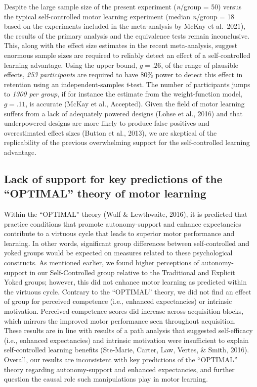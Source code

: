 \documentclass[
  english,
  man, donotrepeattitle,floatsintext]{apa7}
\begin{document}
Despite the large sample size of the present experiment (\emph{n}/group = 50) versus the typical self-controlled motor learning experiment (median \emph{n}/group = 18 based on the experiments included in the meta-analysis by McKay et al.~2021), the results of the primary analysis and the equivalence tests remain inconclusive. This, along with the effect size estimates in the recent meta-analysis, suggest enormous sample sizes are required to reliably detect an effect of a self-controlled learning advantage. Using the upper bound, \(g = .26\), of the range of plausible effects, \emph{253 participants} are required to have 80\% power to detect this effect in retention using an independent-samples \emph{t}-test. The number of participants jumps to \emph{1300 per group}, if for instance the estimate from the weight-function model, \(g = .11\), is accurate (McKay et al., Accepted). Given the field of motor learning suffers from a lack of adequately powered designs (Lohse et al., 2016) and that underpowered designs are more likely to produce false positives and overestimated effect sizes (Button et al., 2013), we are skeptical of the replicability of the previous overwhelming support for the self-controlled learning advantage.

\hypertarget{lack-of-support-for-key-predictions-of-the-optimal-theory-of-motor-learning}{%
\subsection{Lack of support for key predictions of the ``OPTIMAL'' theory of motor learning}\label{lack-of-support-for-key-predictions-of-the-optimal-theory-of-motor-learning}}

Within the ``OPTIMAL'' theory (Wulf \& Lewthwaite, 2016), it is predicted that practice conditions that promote autonomy-support and enhance expectancies contribute to a virtuous cycle that leads to superior motor performance and learning. In other words, significant group differences between self-controlled and yoked groups would be expected on measures related to these psychological constructs. As mentioned earlier, we found higher perceptions of autonomy-support in our Self-Controlled group relative to the Traditional and Explicit Yoked groups; however, this did not enhance motor learning as predicted within the virtuous cycle. Contrary to the ``OPTIMAL'' theory, we did not find an effect of group for perceived competence (i.e., enhanced expectancies) or intrinsic motivation. Perceived competence scores did increase across acquisition blocks, which mirrors the improved motor performance seen throughout acquisition. These results are in line with results of a path analysis that suggested self-efficacy (i.e., enhanced expectancies) and intrinsic motivation were insufficient to explain self-controlled learning benefits (Ste-Marie, Carter, Law, Vertes, \& Smith, 2016). Overall, our results are inconsistent with key predictions of the ``OPTIMAL'' theory regarding autonomy-support and enhanced expectancies, and further question the causal role such manipulations play in motor learning.
\end{document}
